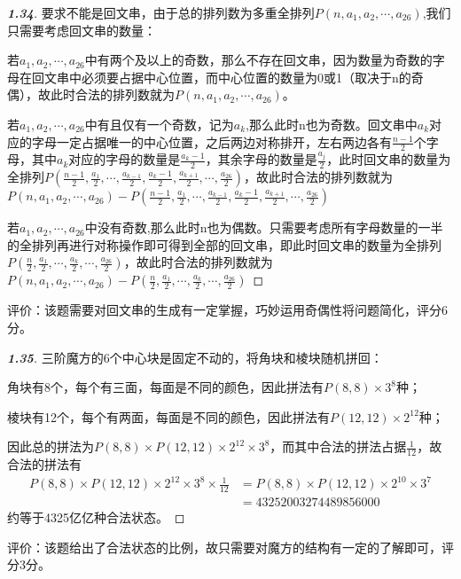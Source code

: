 \documentclass[12pt]{article}
\begin{document}
\begin{proof}[\textbf{1.34}]
    要求不能是回文串，由于总的排列数为多重全排列$P(n,a_1,a_2,\cdots,a_{26})$,我们只需要考虑回文串的数量：

    若$a_1,a_2,\cdots,a_26$中有两个及以上的奇数，那么不存在回文串，因为数量为奇数的字母在回文串中必须要占据中心位置，而中心位置的数量为0或1（取决于n的奇偶），故此时合法的排列数就为$P(n,a_1,a_2,\cdots,a_{26})$。

    若$a_1,a_2,\cdots,a_{26}$中有且仅有一个奇数，记为$a_k$,那么此时n也为奇数。回文串中$a_k$对应的字母一定占据唯一的中心位置，之后两边对称排开，左右两边各有$\frac{n-1}{2}$个字母，其中$a_k$对应的字母的数量是$\frac{a_k-1}{2}$，其余字母的数量是$\frac{a_j}{2}$，此时回文串的数量为全排列$P(\frac{n-1}{2},\frac{a_1}{2},\cdots,\frac{a_{k-1}}{2},\frac{a_{k}-1}{2},\frac{a_{k+1}}{2},\cdots,\frac{a_{26}}{2})$，故此时合法的排列数就为$P(n,a_1,a_2,\cdots,a_{26}) - P(\frac{n-1}{2},\frac{a_1}{2},\cdots,\frac{a_{k-1}}{2},\frac{a_{k}-1}{2},\frac{a_{k+1}}{2},\cdots,\frac{a_{26}}{2})$

    若$a_1,a_2,\cdots,a_{26}$中没有奇数,那么此时n也为偶数。只需要考虑所有字母数量的一半的全排列再进行对称操作即可得到全部的回文串，即此时回文串的数量为全排列\\$P(\frac{n}{2},\frac{a_1}{2},\cdots,\frac{a_{k}}{2},\cdots,\frac{a_{26}}{2})$，故此时合法的排列数就为$P(n,a_1,a_2,\cdots,a_{26}) - P(\frac{n}{2},\frac{a_1}{2},\cdots,\frac{a_{k}}{2},\cdots,\frac{a_{26}}{2})$
\end{proof}
评价：该题需要对回文串的生成有一定掌握，巧妙运用奇偶性将问题简化，评分6分。

\begin{proof}[\textbf{1.35}]
    三阶魔方的6个中心块是固定不动的，将角块和棱块随机拼回：
    
    角块有8个，每个有三面，每面是不同的颜色，因此拼法有$P(8,8) \times 3^8$种；

    棱块有12个，每个有两面，每面是不同的颜色，因此拼法有$P(12,12) \times 2^{12}$种；

    因此总的拼法为$P(8,8) \times P(12,12) \times 2^{12} \times 3^8$，而其中合法的拼法占据$\frac{1}{12}$，故合法的拼法有 
    \begin{align*}
        P(8,8) \times P(12,12) \times 2^{12} \times 3^8 \times \frac{1}{12} &= P(8,8) \times P(12,12) \times 2^{10} \times 3^7 \\
        &= 43252003274489856000 
    \end{align*}
    约等于4325亿亿种合法状态。
\end{proof}
评价：该题给出了合法状态的比例，故只需要对魔方的结构有一定的了解即可，评分3分。
\end{document}
